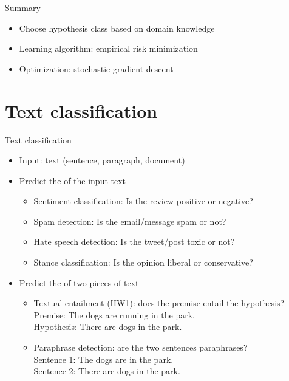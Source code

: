 \documentclass[usenames,dvipsnames,notes,11pt,aspectratio=169]{beamer}
\newcommand{\pdfnote}[1]{}
\begin{document}
\begin{frame}
    {Summary}
    \begin{itemize}
        \itemsep2em
        \item Choose hypothesis class based on domain knowledge
        \item Learning algorithm: empirical risk minimization
        \item Optimization: stochastic gradient descent
    \end{itemize}
\end{frame}

\section{Text classification}

\begin{frame}
    {Text classification}
    \begin{itemize}
        \item Input: text (sentence, paragraph, document)
        \item Predict the  of the input text
            \begin{itemize}
                \item Sentiment classification: Is the review positive or negative?
                \item Spam detection: Is the email/message spam or not?
                \item Hate speech detection: Is the tweet/post toxic or not?
                \item Stance classification: Is the opinion liberal or conservative?
            \end{itemize}
            \pause
        \item Predict the  of two pieces of text
            \begin{itemize}
                \item Textual entailment (HW1): does the premise entail the hypothesis?\\
                    Premise: The dogs are running in the park.\\
                    Hypothesis: There are dogs in the park.
                \item Paraphrase detection: are the two sentences paraphrases?\\
                    Sentence 1: The dogs are in the park.\\
                    Sentence 2: There are dogs in the park.
            \end{itemize}
    \end{itemize}
    \pdfnote{
        Paraphrase detection itself may not always be a well-defined problem.
        Consider the given example, are they paraphrase?
        Well, it depends on the context.
        If the task is image caption, then yes.
        If the task is dialogue response generation, where the context is ``Where are the dogs?'',
        then S1 and S2 convey very different answers to the question.
    }
\end{frame}
\end{document}
